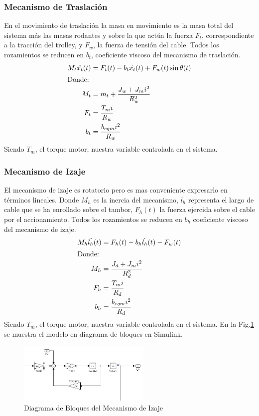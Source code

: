 \documentclass[journal]{IEEEtran}
\begin{document}
\subsubsection{Mecanismo de Traslación}
\label{sec:mecTras}
En el movimiento de traslación la masa en movimiento es la masa
total del sistema más las masas rodantes y sobre la que actúa 
la fuerza $F_t$, correspondiente a la tracción del trolley, y $F_w$, 
la fuerza de tensión del cable. Todos los rozamientos se reducen 
en $b_t$, coeficiente viscoso del mecanismo de traslación.
\begin{align}
    M_t \ddot{x_t}(t) &=  F_t(t) - b_t \dot{x_t}(t) + F_w(t) \sin \theta(t)\\
    \intertext{Donde:}
    M_t &= m_t + \dfrac{J_{w}+J_{m} i^2}{R_{w}^2} \\
    F_t &= \dfrac{T_{m} i}{R_{w}} \\
    b_t &= \dfrac{b_{eqm} i^2}{R_{w}}
\end{align}
Siendo $T_{m}$, el torque motor, nuestra variable controlada en el sistema.

\subsubsection{Mecanismo de Izaje}
\label{sec:mecIza}
El mecanismo de izaje es rotatorio pero es mas conveniente expresarlo
en términos lineales. Donde $M_h$ es la inercia del mecanismo, 
$l_h$ representa el largo de cable
que se ha enrollado sobre el tambor, $F_h(t)$ la fuerza ejercida
sobre el cable por el accionamiento. Todos los rozamientos se reducen 
en $b_h$ coeficiente viscoso del mecanismo de izaje.
\begin{align}
    M_h \ddot{l_h}(t) &=  F_h(t) - b_h \dot{l_h}(t) - F_w(t) \\
    \intertext{Donde:}
    M_h &= \dfrac{J_{d}+J_{m} i^2}{R_{d}^2} \\
    F_h &= \dfrac{T_{m} i}{R_{d}} \\
    b_h &= \dfrac{b_{eqm} i^2}{R_{d}}
\end{align}
Siendo $T_{m}$, el torque motor, nuestra variable controlada en el sistema.
En la Fig.\ref{fig:fisica} se muestra el modelo en diagrama de bloques en Simulink.
\begin{figure}[!t]
 \centering
  \includegraphics[width=2.5in]{analisis_sistema_fisico.jpeg}
  \caption{Diagrama de Bloques del Mecanismo de Izaje}
  \label{fig:fisica}
\end{figure}
\end{document}
